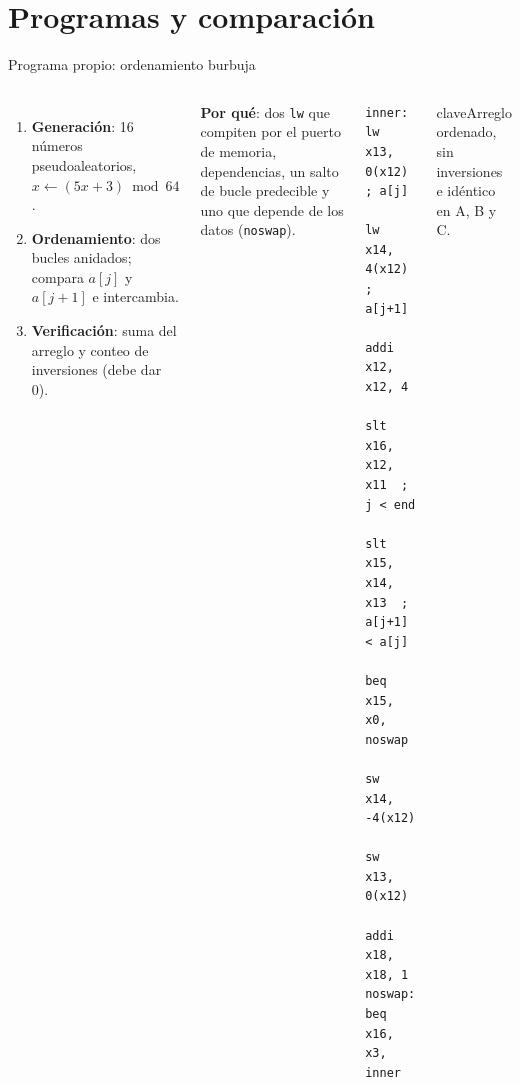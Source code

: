 \documentclass[aspectratio=169,10pt]{beamer}
\newcommand{\clave}[1]{\begin{beamercolorbox}[rounded=true,sep=6pt]{clave}#1\end{beamercolorbox}}
\begin{document}
\section{Programas y comparación}

\begin{frame}[fragile]{Programa propio: ordenamiento burbuja}
  \begin{columns}[T]
    \small
    \begin{enumerate}
      \item \textbf{Generación}: 16 números pseudoaleatorios, $x \leftarrow (5x+3) \bmod 64$.
      \item \textbf{Ordenamiento}: dos bucles anidados; compara $a[j]$ y $a[j+1]$ e intercambia.
      \item \textbf{Verificación}: suma del arreglo y conteo de inversiones (debe dar 0).
    \end{enumerate}
    \medskip
    \textbf{Por qué}: dos \texttt{lw} que compiten por el puerto de memoria, dependencias, un salto de bucle predecible y uno que depende de los datos (\texttt{noswap}).
    \footnotesize
\begin{verbatim}
inner:  lw   x13, 0(x12)    ; a[j]
        lw   x14, 4(x12)    ; a[j+1]
        addi x12, x12, 4
        slt  x16, x12, x11  ; j < end
        slt  x15, x14, x13  ; a[j+1] < a[j]
        beq  x15, x0, noswap
        sw   x14, -4(x12)
        sw   x13, 0(x12)
        addi x18, x18, 1
noswap: beq  x16, x3, inner
\end{verbatim}
    \clave{\footnotesize Arreglo ordenado, sin inversiones e idéntico en A, B y C.}
  \end{columns}
\end{frame}
\end{document}
